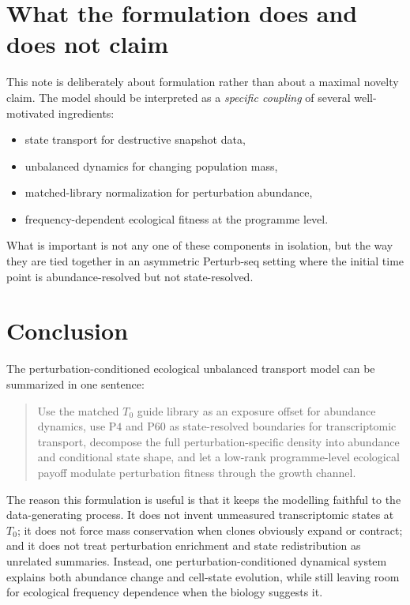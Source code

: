 \documentclass[11pt]{article}
\newcommand{\1}{\mathbf{1}}
\newcommand{\Tzero}{T_0}
\newcommand{\Pfour}{\mathrm{P4}}
\newcommand{\Psixty}{\mathrm{P60}}
\theoremstyle{plain}
\begin{document}
\section{What the formulation does and does not claim}

This note is deliberately about formulation rather than about a maximal novelty claim. The model should be interpreted as a \emph{specific coupling} of several well-motivated ingredients:
\begin{itemize}
    \item state transport for destructive snapshot data,
    \item unbalanced dynamics for changing population mass,
    \item matched-library normalization for perturbation abundance,
    \item frequency-dependent ecological fitness at the programme level.
\end{itemize}

What is important is not any one of these components in isolation, but the way they are tied together in an asymmetric Perturb-seq setting where the initial time point is abundance-resolved but not state-resolved.

\section{Conclusion}

The perturbation-conditioned ecological unbalanced transport model can be summarized in one sentence:

\begin{quote}
Use the matched $\Tzero$ guide library as an exposure offset for abundance dynamics, use $\Pfour$ and $\Psixty$ as state-resolved boundaries for transcriptomic transport, decompose the full perturbation-specific density into abundance and conditional state shape, and let a low-rank programme-level ecological payoff modulate perturbation fitness through the growth channel.
\end{quote}

The reason this formulation is useful is that it keeps the modelling faithful to the data-generating process. It does not invent unmeasured transcriptomic states at $\Tzero$; it does not force mass conservation when clones obviously expand or contract; and it does not treat perturbation enrichment and state redistribution as unrelated summaries. Instead, one perturbation-conditioned dynamical system explains both abundance change and cell-state evolution, while still leaving room for ecological frequency dependence when the biology suggests it.
\end{document}
